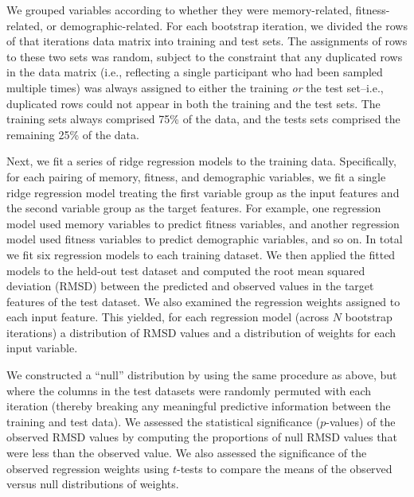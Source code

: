 \documentclass[10pt]{article}
\begin{document}
We grouped variables according to whether they were memory-related,
fitness-related, or demographic-related.  For each bootstrap
iteration, we divided the rows of that iterations data matrix into
training and test sets.  The assignments of rows to these two sets was
random, subject to the constraint that any duplicated rows in the data
matrix (i.e., reflecting a single participant who had been sampled
multiple times) was always assigned to either the training \textit{or}
the test set--i.e., duplicated rows could not appear in both the
training and the test sets.  The training sets always comprised 75\%
of the data, and the tests sets comprised the remaining 25\% of the
data.

Next, we fit a series of ridge regression models to the training data.
Specifically, for each pairing of memory, fitness, and demographic
variables, we fit a single ridge regression model treating the first
variable group as the input features and the second variable group as
the target features.  For example, one regression model used memory
variables to predict fitness variables, and another regression model
used fitness variables to predict demographic variables, and so on.
In total we fit six regression models to each training dataset.  We
then applied the fitted models to the held-out test dataset and
computed the root mean squared deviation (RMSD) between the predicted
and observed values in the target features of the test dataset.  We
also examined the regression weights assigned to each input feature.
This yielded, for each regression model (across $N$ bootstrap
iterations) a distribution of RMSD values and a distribution of
weights for each input variable.

We constructed a ``null'' distribution by using the same procedure as
above, but where the columns in the test datasets were randomly
permuted with each iteration (thereby breaking any meaningful
predictive information between the training and test data).  We
assessed the statistical significance ($p$-values) of the observed
RMSD values by computing the proportions of null RMSD values that were
less than the observed value.  We also assessed the significance of
the observed regression weights using $t$-tests to compare the means
of the observed versus null distributions of weights.
\end{document}
